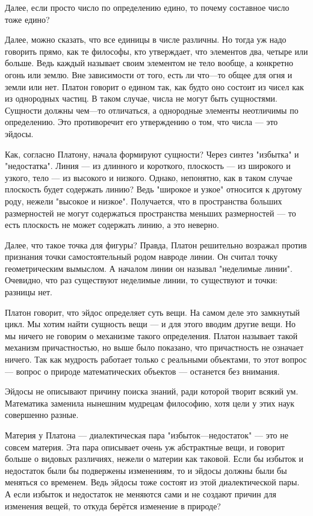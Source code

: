 \documentclass[oneside, 17pt, dvipsnames]{extbook}
\begin{document}
Далее, если просто число по определению едино, то почему составное число тоже едино?

Далее, можно сказать, что все единицы в числе различны. Но тогда уж надо говорить прямо, как те философы, кто утверждает, что элементов два, четыре или больше. Ведь каждый называет своим элементом не тело вообще, а конкретно огонь или землю. Вне зависимости от того, есть ли что---то общее для огня и земли или нет. Платон говорит о едином так, как будто оно состоит из чисел как из однородных частиц. В таком случае, числа не могут быть сущностями. Сущности должны чем---то отличаться, а однородные элементы неотличимы по определению. Это противоречит его утверждению о том, что числа --- это эйдосы.

Как, согласно Платону, начала формируют сущности? Через синтез "избытка" и "недостатка". Линия --- из длинного и короткого, плоскость --- из широкого и узкого, тело --- из высокого и низкого. Однако, непонятно, как в таком случае плоскость будет содержать линию? Ведь "широкое и узкое" относится к другому роду, нежели "высокое и низкое". Получается, что в пространства больших размерностей не могут содержаться пространства меньших размерностей --- то есть плоскость не может содержать линию, а это неверно.

Далее, что такое точка для фигуры? Правда, Платон решительно возражал против признания точки самостоятельный родом навроде линии. Он считал точку геометрическим вымыслом. А началом линии он называл "неделимые линии". Очевидно, что раз существуют неделимые линии, то существуют и точки: разницы нет.

Платон говорит, что эйдос определяет суть вещи. На самом деле это замкнутый цикл. Мы хотим найти сущность вещи --- и для этого вводим другие вещи. Но мы ничего не говорим о механизме такого определения. Платон называет такой механизм причастностью, но выше было показано, что причастность не означает ничего. Так как мудрость работает только с реальными объектами, то этот вопрос --- вопрос о природе математических объектов --- останется без внимания.

Эйдосы не описывают причину поиска знаний, ради которой творит всякий ум. Математика заменила нынешним мудрецам философию, хотя цели у этих наук совершенно разные.

Материя у Платона --- диалектическая пара "избыток---недостаток" --- это не совсем материя. Эта пара описывает очень уж абстрактные вещи, и говорит больше о видовых различиях, нежели о материи как таковой. Если бы избыток и недостаток были бы подвержены изменениям, то и эйдосы должны были бы меняться со временем. Ведь эйдосы тоже состоят из этой диалектической пары. А если избыток и недостаток не меняются сами и не создают причин для изменения вещей, то откуда берётся изменение в природе?
\end{document}
